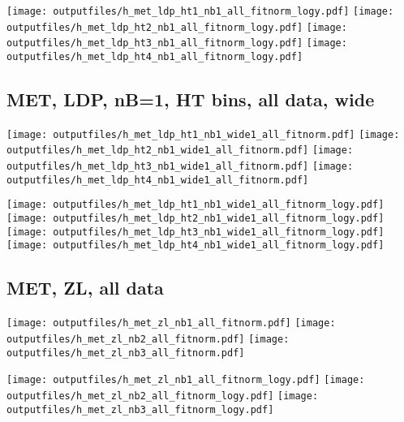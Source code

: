 \documentclass[11pt]{article}
\begin{document}
    \noindent
     \texttt{[image: outputfiles/h\_met\_ldp\_ht1\_nb1\_all\_fitnorm\_logy.pdf]}
     \texttt{[image: outputfiles/h\_met\_ldp\_ht2\_nb1\_all\_fitnorm\_logy.pdf]}
     \texttt{[image: outputfiles/h\_met\_ldp\_ht3\_nb1\_all\_fitnorm\_logy.pdf]}
     \texttt{[image: outputfiles/h\_met\_ldp\_ht4\_nb1\_all\_fitnorm\_logy.pdf]}


    \clearpage
     \subsection{ MET, LDP, nB=1, HT bins, all data, wide}

    \noindent
     \texttt{[image: outputfiles/h\_met\_ldp\_ht1\_nb1\_wide1\_all\_fitnorm.pdf]}
     \texttt{[image: outputfiles/h\_met\_ldp\_ht2\_nb1\_wide1\_all\_fitnorm.pdf]}
     \texttt{[image: outputfiles/h\_met\_ldp\_ht3\_nb1\_wide1\_all\_fitnorm.pdf]}
     \texttt{[image: outputfiles/h\_met\_ldp\_ht4\_nb1\_wide1\_all\_fitnorm.pdf]}

    \noindent
     \texttt{[image: outputfiles/h\_met\_ldp\_ht1\_nb1\_wide1\_all\_fitnorm\_logy.pdf]}
     \texttt{[image: outputfiles/h\_met\_ldp\_ht2\_nb1\_wide1\_all\_fitnorm\_logy.pdf]}
     \texttt{[image: outputfiles/h\_met\_ldp\_ht3\_nb1\_wide1\_all\_fitnorm\_logy.pdf]}
     \texttt{[image: outputfiles/h\_met\_ldp\_ht4\_nb1\_wide1\_all\_fitnorm\_logy.pdf]}




     \subsection{ MET, ZL, all data}

    \noindent
     \texttt{[image: outputfiles/h\_met\_zl\_nb1\_all\_fitnorm.pdf]}
     \texttt{[image: outputfiles/h\_met\_zl\_nb2\_all\_fitnorm.pdf]}
     \texttt{[image: outputfiles/h\_met\_zl\_nb3\_all\_fitnorm.pdf]}

    \noindent
     \texttt{[image: outputfiles/h\_met\_zl\_nb1\_all\_fitnorm\_logy.pdf]}
     \texttt{[image: outputfiles/h\_met\_zl\_nb2\_all\_fitnorm\_logy.pdf]}
     \texttt{[image: outputfiles/h\_met\_zl\_nb3\_all\_fitnorm\_logy.pdf]}
\end{document}
